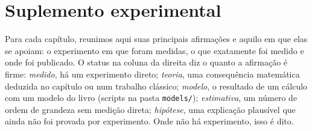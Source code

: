 \chapter{Suplemento experimental}
\label{sec:supplement}

Para cada capítulo, reunimos aqui suas principais afirmações e aquilo em que elas se apoiam: o experimento em que foram medidas, o que exatamente foi medido e onde foi publicado. O status na coluna da direita diz o quanto a afirmação é firme: \emph{medido}, há um experimento direto; \emph{teoria}, uma consequência matemática deduzida no capítulo ou num trabalho clássico; \emph{modelo}, o resultado de um cálculo com um modelo do livro (scripts na pasta \texttt{models/}); \emph{estimativa}, um número de ordem de grandeza sem medição direta; \emph{hipótese}, uma explicação plausível que ainda não foi provada por experimento. Onde não há experimento, isso é dito.























